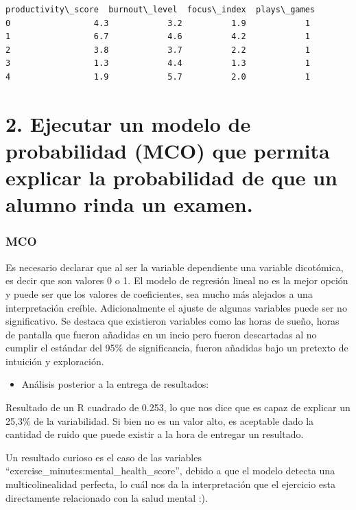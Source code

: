 \documentclass[11pt]{article}
\providecommand{\tightlist}{%
      \setlength{\itemsep}{0pt}\setlength{\parskip}{0pt}}
\begin{document}
    \begin{Verbatim}[commandchars=\\\{\}]
   productivity\_score  burnout\_level  focus\_index  plays\_games
0                 4.3            3.2          1.9            1
1                 6.7            4.6          4.2            1
2                 3.8            3.7          2.2            1
3                 1.3            4.4          1.3            1
4                 1.9            5.7          2.0            1
    \end{Verbatim}

    \section{2. Ejecutar un modelo de probabilidad (MCO) que permita
explicar la probabilidad de que un alumno rinda un
examen.}\label{ejecutar-un-modelo-de-probabilidad-mco-que-permita-explicar-la-probabilidad-de-que-un-alumno-rinda-un-examen.}

\subsubsection{MCO}\label{mco}

Es necesario declarar que al ser la variable dependiente una variable
dicotómica, es decir que son valores 0 o 1. El modelo de regresión
lineal no es la mejor opción y puede ser que los valores de
coeficientes, sea mucho más alejados a una interpretación creíble.
Adicionalmente el ajuste de algunas variables puede ser no
significativo. Se destaca que existieron variables como las horas de
sueño, horas de pantalla que fueron añadidas en un incio pero fueron
descartadas al no cumplir el estándar del 95\% de significancia, fueron
añadidas bajo un pretexto de intuición y exploración.

\begin{itemize}
\tightlist
\item
  Análisis posterior a la entrega de resultados:
\end{itemize}

Resultado de un R cuadrado de 0.253, lo que nos dice que es capaz de
explicar un 25,3\% de la variabilidad. Si bien no es un valor alto, es
aceptable dado la cantidad de ruido que puede existir a la hora de
entregar un resultado.

Un resultado curioso es el caso de las variables
``exercise\_minutes:mental\_health\_score'', debido a que el modelo
detecta una multicolinealidad perfecta, lo cuál nos da la interpretación
que el ejercicio esta directamente relacionado con la salud mental :).
\end{document}
